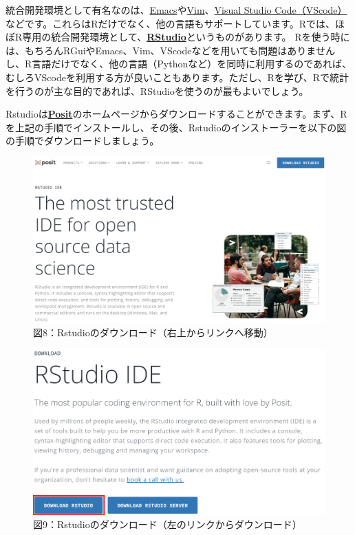 \documentclass[
  letterpaper,
  DIV=11,
  numbers=noendperiod]{scrreprt}
\begin{document}
統合開発環境として有名なのは、\href{https://www.gnu.org/software/emacs/}{Emacs}や\href{https://www.vim.org/}{Vim}、\href{https://azure.microsoft.com/ja-jp/products/visual-studio-code}{Visual
Studio
Code（VScode）}などです。これらはRだけでなく、他の言語もサポートしています。Rでは、ほぼR専用の統合開発環境として、\href{https://posit.co/products/open-source/rstudio/}{\textbf{RStudio}}というものがあります。
Rを使う時には、もちろんRGuiやEmacs、Vim、VScodeなどを用いても問題はありませんし、R言語だけでなく、他の言語（Pythonなど）を同時に利用するのであれば、むしろVScodeを利用する方が良いこともあります。ただし、Rを学び、Rで統計を行うのが主な目的であれば、RStudioを使うのが最もよいでしょう。

Rstudioは\href{https://posit.co/products/open-source/rstudio/}{\textbf{Posit}}のホームページからダウンロードすることができます。まず、Rを上記の手順でインストールし、その後、Rstudioのインストーラーを以下の図の手順でダウンロードしましょう。

\begin{figure}

{\centering \includegraphics{././image/Posit_Rstudio.png}

}

\caption{図8：Rstudioのダウンロード（右上からリンクへ移動）}

\end{figure}

\begin{figure}

{\centering \includegraphics{././image/Posit_Rstudio2.png}

}

\caption{図9：Rstudioのダウンロード（左のリンクからダウンロード）}

\end{figure}
\end{document}
